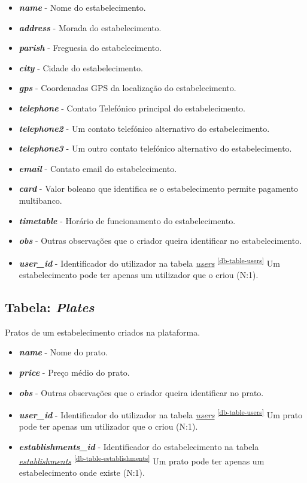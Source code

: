 \documentclass[11pt, a4paper, sans]{article}
\begin{document}
	\begin{itemize}
		\item \textbf{\textit{name}} - Nome do estabelecimento.
		\item \textbf{\textit{address}} - Morada do estabelecimento.
		\item \textbf{\textit{parish}} - Freguesia do estabelecimento.
		\item \textbf{\textit{city}} - Cidade do estabelecimento.
		\item \textbf{\textit{gps}} - Coordenadas GPS da localização do estabelecimento.
		\item \textbf{\textit{telephone}} - Contato Telefónico principal do estabelecimento.
		\item \textbf{\textit{telephone2}} - Um contato telefónico alternativo do estabelecimento.
		\item \textbf{\textit{telephone3}} - Um outro contato telefónico alternativo do estabelecimento.
		\item \textbf{\textit{email}} - Contato email do estabelecimento.
		\item \textbf{\textit{card}} - Valor boleano que identifica se o estabelecimento permite pagamento
			multibanco.
		\item \textbf{\textit{timetable}} - Horário de funcionamento do estabelecimento.
		\item \textbf{\textit{obs}} - Outras observações que o criador queira identificar no estabelecimento.
		\item \textbf{\textit{user\_id}} - Identificador do utilizador na tabela 
			\underline{\textit{users}} \textsuperscript{\ref{db-table-users}} 
			Um estabelecimento pode ter apenas um utilizador que o criou (N:1).
	\end{itemize}

	\subsection{Tabela: \textit{Plates}} \label{db-table-plates}

	Pratos de um estabelecimento criados na plataforma.

	\begin{itemize}
		\item \textbf{\textit{name}} - Nome do prato.
		\item \textbf{\textit{price}} - Preço médio do prato.
		\item \textbf{\textit{obs}} - Outras observações que o criador queira identificar no prato.
		\item \textbf{\textit{user\_id}} - Identificador do utilizador na tabela 
			\underline{\textit{users}} \textsuperscript{\ref{db-table-users}} 
			Um prato pode ter apenas um utilizador que o criou (N:1).
		\item \textbf{\textit{establishments\_id}} - Identificador do estabelecimento na tabela 
			\underline{\textit{establishments}} \textsuperscript{\ref{db-table-establishments}} 
			Um prato pode ter apenas um estabelecimento onde existe (N:1).
	\end{itemize}
\end{document}

